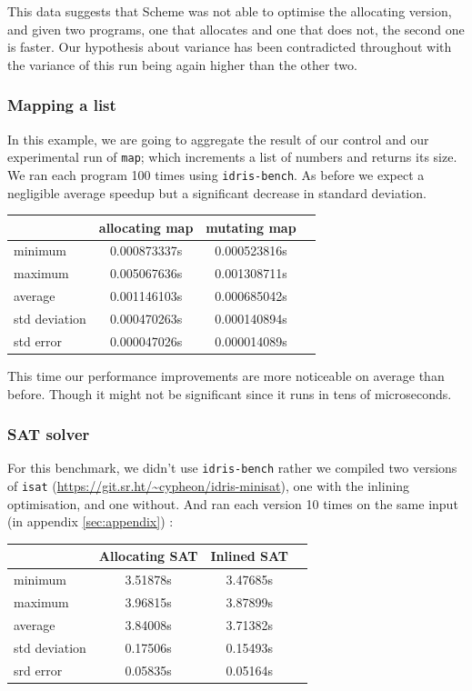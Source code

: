 \documentclass[
]{article}
\begin{document}
This data suggests that Scheme was not able to optimise the allocating
version, and given two programs, one that allocates and one that does
not, the second one is faster. Our hypothesis about variance has been
contradicted throughout with the variance of this run being again higher
than the other two.

\hypertarget{mapping-a-list}{%
\subsubsection{Mapping a list}\label{mapping-a-list}}

In this example, we are going to aggregate the result of our control and
our experimental run of \texttt{map}; which increments a list of numbers
and returns its size. We ran each program 100 times using
\texttt{idris-bench}. As before we expect a negligible average speedup
but a significant decrease in standard deviation.

\begin{tabular}{ l | c c c }
          & allocating map & mutating map \\
\hline 
  minimum       & 0.000873337s & 0.000523816s \\
  maximum       & 0.005067636s & 0.001308711s \\ 
  average       & 0.001146103s & 0.000685042s \\
  std deviation & 0.000470263s & 0.000140894s\\
  std error     & 0.000047026s & 0.000014089s\\
\end{tabular}

This time our performance improvements are more noticeable on average
than before. Though it might not be significant since it runs in tens of
microseconds.

\hypertarget{sat-solver}{%
\subsubsection{SAT solver}\label{sat-solver}}

For this benchmark, we didn't use \texttt{idris-bench} rather we
compiled two versions of \texttt{isat}
(\url{https://git.sr.ht/~cypheon/idris-minisat}), one with the inlining
optimisation, and one without. And ran each version 10 times on the same
input (in appendix \ref{sec:appendix}) :

\begin{tabular}{ l | c c c }
          & Allocating SAT & Inlined SAT \\
\hline 
  minimum       & 3.51878s & 3.47685s \\
  maximum       & 3.96815s & 3.87899s \\
  average       & 3.84008s & 3.71382s \\
  std deviation & 0.17506s & 0.15493s \\
  srd error     & 0.05835s & 0.05164s \\
\end{tabular}
\end{document}
